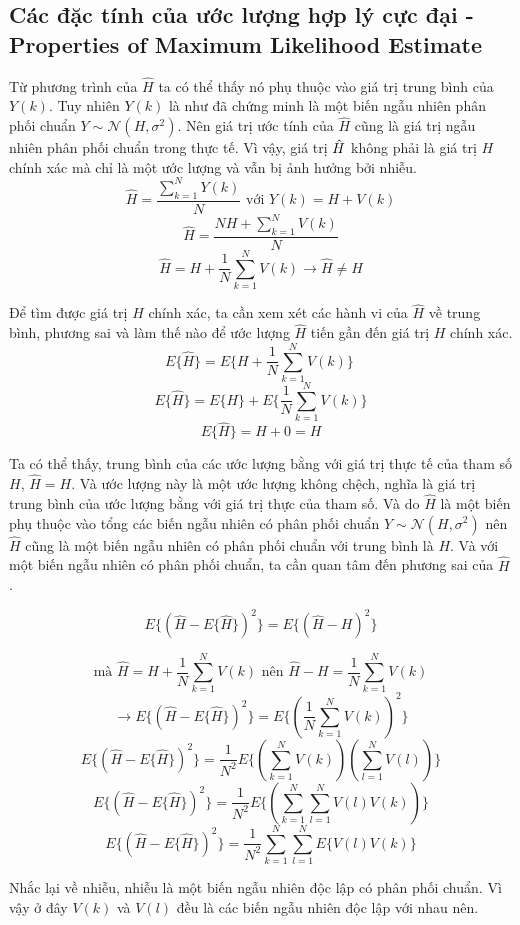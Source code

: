 \documentclass{article}
\begin{document}
\subsection{Các đặc tính của ước lượng hợp lý cực đại - Properties of Maximum Likelihood Estimate }
Từ phương trình của $\hat{H}$ ta có thể thấy nó phụ thuộc vào giá trị trung bình của $Y(k)$. Tuy nhiên $Y(k)$ là như đã chứng minh là một biến ngẫu nhiên phân phối chuẩn $Y \sim \mathcal{N}(H,\sigma^2)$. Nên giá trị ước tính của $\hat{H}$ cũng là giá trị ngẫu nhiên phân phối chuẩn trong thực tế. Vì vậy, giá trị $\Hat{H}$ không phải là giá trị $H$ chính xác mà chỉ là một ước lượng và vẫn bị ảnh hưởng bởi nhiễu.
$$\hat{H} = \frac{\sum_{k=1}^{N}Y(k)}{N} \text{ với }Y(k) = H + V(k) $$
$$\hat{H} = \frac{NH + \sum_{k=1}^{N}V(k) }{N}$$
$$\hat{H} = H + \frac{1}{N} \sum_{k=1}^{N}V(k) \rightarrow \hat{H} \neq H$$

Để tìm được giá trị $H$ chính xác, ta cần xem xét các hành vi của $\hat{H}$ về trung bình, phương sai và làm thế nào để ước lượng $\hat{H}$ tiến gần đến giá trị $H$ chính xác.
\[ E\{\hat{H}\} = E\{H + \frac{1}{N}\sum_{k=1}^{N}V(k)\}\ \]
$$ E\{\hat{H}\} = E\{H\} + E\{\frac{1}{N}\sum_{k=1}^{N}V(k)\}$$
$$ E\{\hat{H}\} = H + 0 = H $$

Ta có thể thấy, trung bình của các ước lượng bằng với giá trị thực tế của tham số $H$, $\hat{H} = H$. Và ước lượng này là một ước lượng không chệch, nghĩa là giá trị trung bình của ước lượng bằng với giá trị thực của tham số. Và do $\hat{H}$ là một biến phụ thuộc vào tổng các biến ngẫu nhiên có phân phối chuẩn $Y \sim \mathcal{N}(H,\sigma^2)$ nên $\hat{H}$ cũng là một biến ngẫu nhiên có phân phối chuẩn với trung bình là $H$. Và với một biến ngẫu nhiên có phân phối chuẩn, ta cần quan tâm đến phương sai của $\hat{H}$.

$$E\{ (\hat{H} - E\{\hat{H}\})^2 \} = E\{ (\hat{H} - H)^2 \}$$

$$ \text{mà } \hat{H} = H + \frac{1}{N} \sum_{k=1}^{N}V(k) \text{ nên }  \hat{H} - H = \frac{1}{N} \sum_{k=1}^{N}V(k)$$ 
$$ \rightarrow E\{ (\hat{H} - E\{\hat{H}\})^2 \} = E \{ ( \frac{1}{N} \sum_{k=1}^{N}V(k) )^2 \}  $$
$$E\{ (\hat{H} - E\{\hat{H}\})^2 \} = \frac{1}{N^2} E\{ ( \sum_{k=1}^{N}V(k)) ( \sum_{l=1}^{N}V(l)) \}$$
$$E\{ (\hat{H} - E\{\hat{H}\})^2 \} = \frac{1}{N^2} E\{ ( \sum_{k=1}^{N} \sum_{l=1}^{N}V(l)V(k)) \}$$
$$E\{ (\hat{H} - E\{\hat{H}\})^2 \} = \frac{1}{N^2} \sum_{k=1}^{N} \sum_{l=1}^{N}   E\{ V(l)V(k) \}$$

Nhắc lại về nhiễu, nhiễu là một biến ngẫu nhiên độc lập có phân phối chuẩn. Vì vậy ở đây $V(k)$ và $V(l)$ đều là các biến ngẫu nhiên độc lập với nhau nên.
\end{document}
